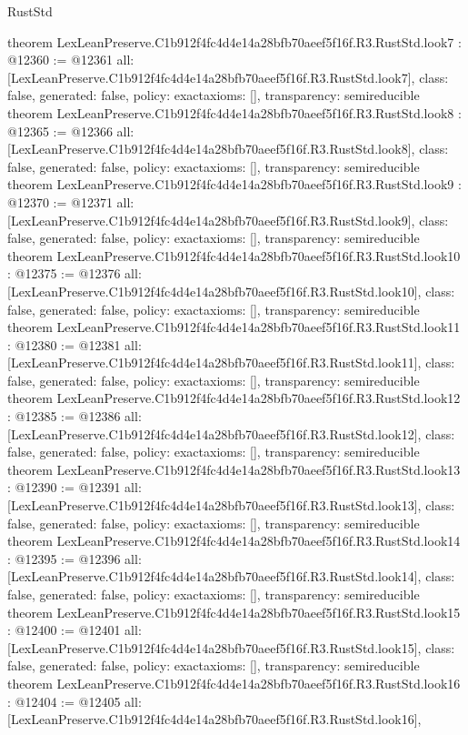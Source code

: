 \begin{lexlean}{RustStd}
\begin{coremodule}
{}
theorem LexLeanPreserve.C1b912f4fc4d4e14a28bfb70aeef5f16f.R3.RustStd.look7 : @12360 := @12361 {
  all: [LexLeanPreserve.C1b912f4fc4d4e14a28bfb70aeef5f16f.R3.RustStd.look7],
  class: false,
  generated: false,
  policy: exact{axioms: []},
  transparency: semireducible
}
theorem LexLeanPreserve.C1b912f4fc4d4e14a28bfb70aeef5f16f.R3.RustStd.look8 : @12365 := @12366 {
  all: [LexLeanPreserve.C1b912f4fc4d4e14a28bfb70aeef5f16f.R3.RustStd.look8],
  class: false,
  generated: false,
  policy: exact{axioms: []},
  transparency: semireducible
}
theorem LexLeanPreserve.C1b912f4fc4d4e14a28bfb70aeef5f16f.R3.RustStd.look9 : @12370 := @12371 {
  all: [LexLeanPreserve.C1b912f4fc4d4e14a28bfb70aeef5f16f.R3.RustStd.look9],
  class: false,
  generated: false,
  policy: exact{axioms: []},
  transparency: semireducible
}
theorem LexLeanPreserve.C1b912f4fc4d4e14a28bfb70aeef5f16f.R3.RustStd.look10 : @12375 := @12376 {
  all: [LexLeanPreserve.C1b912f4fc4d4e14a28bfb70aeef5f16f.R3.RustStd.look10],
  class: false,
  generated: false,
  policy: exact{axioms: []},
  transparency: semireducible
}
theorem LexLeanPreserve.C1b912f4fc4d4e14a28bfb70aeef5f16f.R3.RustStd.look11 : @12380 := @12381 {
  all: [LexLeanPreserve.C1b912f4fc4d4e14a28bfb70aeef5f16f.R3.RustStd.look11],
  class: false,
  generated: false,
  policy: exact{axioms: []},
  transparency: semireducible
}
theorem LexLeanPreserve.C1b912f4fc4d4e14a28bfb70aeef5f16f.R3.RustStd.look12 : @12385 := @12386 {
  all: [LexLeanPreserve.C1b912f4fc4d4e14a28bfb70aeef5f16f.R3.RustStd.look12],
  class: false,
  generated: false,
  policy: exact{axioms: []},
  transparency: semireducible
}
theorem LexLeanPreserve.C1b912f4fc4d4e14a28bfb70aeef5f16f.R3.RustStd.look13 : @12390 := @12391 {
  all: [LexLeanPreserve.C1b912f4fc4d4e14a28bfb70aeef5f16f.R3.RustStd.look13],
  class: false,
  generated: false,
  policy: exact{axioms: []},
  transparency: semireducible
}
theorem LexLeanPreserve.C1b912f4fc4d4e14a28bfb70aeef5f16f.R3.RustStd.look14 : @12395 := @12396 {
  all: [LexLeanPreserve.C1b912f4fc4d4e14a28bfb70aeef5f16f.R3.RustStd.look14],
  class: false,
  generated: false,
  policy: exact{axioms: []},
  transparency: semireducible
}
theorem LexLeanPreserve.C1b912f4fc4d4e14a28bfb70aeef5f16f.R3.RustStd.look15 : @12400 := @12401 {
  all: [LexLeanPreserve.C1b912f4fc4d4e14a28bfb70aeef5f16f.R3.RustStd.look15],
  class: false,
  generated: false,
  policy: exact{axioms: []},
  transparency: semireducible
}
theorem LexLeanPreserve.C1b912f4fc4d4e14a28bfb70aeef5f16f.R3.RustStd.look16 : @12404 := @12405 {
  all: [LexLeanPreserve.C1b912f4fc4d4e14a28bfb70aeef5f16f.R3.RustStd.look16],
}
\end{coremodule}
\end{lexlean}
